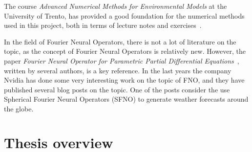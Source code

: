 The course \textit{Advanced Numerical Methods for Environmental Models} at the University of Trento, has provided a good foundation for the numerical methods used in this project, both in terms of lecture notes and exercises~\cite{trento_course}.

In the field of Fourier Neural Operators, there is not a lot of literature on the topic, as the concept of Fourier Neural Operators is relatively new.
However, the paper \textit{Fourier Neural Operator for Parametric Partial Differential Equations}~\cite{FNO_2021}, written by several authors, is a key reference.
In the last years the company Nvidia has done some very interesting work on the topic of FNO, and they have published several blog posts on the topic.
One of the posts consider the use Spherical Fourier Neural Operators (SFNO) to generate weather forecasts around the globe\cite{Nvidia2023}.

\section{Thesis overview}




